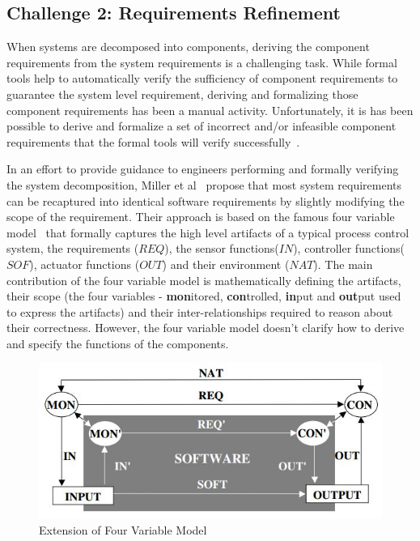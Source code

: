\subsection{Challenge 2: Requirements Refinement}

When systems are decomposed into components, deriving the component requirements from the system requirements is a challenging task. While formal tools help to automatically verify the sufficiency of component requirements to guarantee the system level requirement, deriving and formalizing those component requirements has been a manual activity. Unfortunately, it is has been possible to derive and formalize a set of incorrect and/or infeasible component requirements that the formal tools will verify successfully~\cite{gacek2015towards}.

In an effort to provide guidance to engineers performing and formally verifying the system decomposition, Miller et al~\cite{extending4varmodel} propose that most system requirements can be recaptured into identical software requirements by slightly modifying the scope of the requirement. Their approach is based on the famous four variable model~\cite{Parnas91:four-variable} that formally captures the high level artifacts of a typical process control system, the requirements ($REQ$), the sensor functions($IN$), controller functions($SOF$), actuator functions ($OUT$) and their environment ($NAT$). The main contribution of the four variable model is mathematically defining the artifacts, their scope (the four variables - \textbf{mon}itored, \textbf{con}trolled, \textbf{in}put and \textbf{out}put used to express the artifacts) and their inter-relationships required to reason about their correctness. However, the four variable model doesn't clarify how to derive and specify the functions of the components.

\begin{figure}[h!]
    \centering
    \includegraphics[scale=0.6] {images/FourVarExtn.jpg}
    \caption{Extension of Four Variable Model}
    \label{fig:extn-four-var}
 \end{figure}

